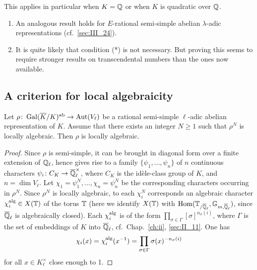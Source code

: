 This applies in particular when $K = \mathbb{Q}$ or when $K$ is quadratic over $\mathbb{Q}$.

\begin{obs}
\begin{enumerate}
	\item An analogous result holds for $E$-rational semi-simple abelian
$\lambda$-adic representations (cf.\ \ref{sec:III_24}).
	\item It is quite likely that condition (*) is not necessary. But
proving this seems to require stronger results on transcendental numbers than
the ones now available.
\end{enumerate}
\end{obs}

\subsection{A criterion for local algebraicity}
\label{sec:III_32}
\begin{prop}
	Let $\rho\colon \operatorname{Gal}(\overline{K}/K)^{\mathrm{ab}} \to \operatorname{Aut}(V_\ell)$ be a rational
	semi-simple $\ell$-adic abelian representation of $K$. Assume that
	there exists an integer $N \ge 1$ such that $\rho^N$ is locally
	algebraic. Then $\rho$ is locally algebraic.
\end{prop}
\begin{proof}
	\dpage
	Since $\rho$ is semi-simple, it can be brought in diagonal form over a
	finite extension of $\mathbb{Q}_\ell$, hence gives rise to a family $\{ \psi_1,
	\dots, \psi_n \}$ of $n$ continuous characters $\psi_i\colon C_K \to
	\overline{\mathbb{Q}}_\ell^\times$, where $C_K$ is the idèle-class group of $K$,
	and $n = \dim V_\ell$.
	Let $\chi_1 = \psi_1^N, \dots, \chi_n = \psi_n^N$ be the corresponding
	characters occurring in $\rho^N$. Since $\rho^N$ is locally algebraic,
	to each $\chi_i^N$ corresponds an algebraic character $\chi_i^{\rm alg}
	\in X(\mathbb{T})$ of the torus $\mathbb{T}$ (here we identify $X(\mathbb{T})$ with
	$\operatorname{Hom}(\mathbb{T}_{/\overline{\mathbb{Q}}_\ell}, \mathbb{G}_{m, \overline{\mathbb{Q}}_\ell})$, since
	$\overline{\mathbb{Q}}_\ell$ is algebraically closed). Each $\chi_i^{\rm alg}$ is of
	the form $\prod_{\sigma \in \Gamma} [\sigma]^{n_\sigma(i)}$, where
	$\Gamma$ is the set of embeddings of $K$ into $\overline{\mathbb{Q}}_\ell$, cf.\ 
	Chap.~\ref{ch:ii}, \ref{sec:II_11}. One has
	\[
		\chi_i(x) = \chi_i^{\rm alg}(x^{-1}) = \prod_{\sigma \in
		\Gamma} \sigma(x)^{-n_\sigma(i)}
	\]
	for all $x \in K_\ell^\times$ close enough to 1.
\end{proof}

